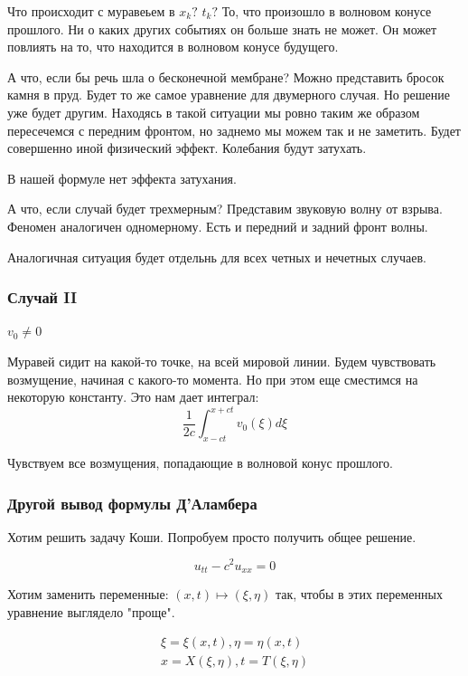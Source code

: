 \documentclass[12pt]{report}
\begin{document}
Что происходит с муравеьем в $x_k?$ $t_k?$ То, что произошло в волновом конусе прошлого. Ни о каких других событиях он больше знать не может. Он может повлиять на то, что находится в волновом конусе будущего. 

А что, если бы речь шла о бесконечной мембране? Можно представить бросок камня в пруд. Будет то же самое уравнение для двумерного случая. Но решение уже будет другим. Находясь в такой ситуации мы ровно таким же образом пересечемся с передним фронтом, но заднемо мы можем так и не заметить. Будет совершенно иной физический эффект. Колебания будут затухать. 

В нашей формуле нет эффекта затухания.

А что, если случай будет трехмерным? Представим звуковую волну от взрыва. Феномен аналогичен одномерному. Есть и передний и задний фронт волны. 

Аналогичная ситуация будет отдельнь для всех четных и нечетных случаев. 

\subsubsection{Случай II}
$v_0 \ne 0$

Муравей сидит на какой-то точке, на всей мировой линии. Будем чувствовать возмущение, начиная с какого-то момента. Но при этом еще сместимся на некоторую константу. Это нам дает интеграл: 
$$
    \frac{1}{2c} \int^{x + ct}_{x - ct}{v_0(\xi)d\xi}
$$

Чувствуем все возмущения, попадающие в волновой конус прошлого. 
    
\subsubsection{Другой вывод формулы Д'Аламбера}

Хотим решить задачу Коши. Попробуем просто получить общее решение. 

\begin{equation} \label{pro:DAeq}
    u_{tt} - c ^ 2 u_{xx} = 0
\end{equation}


Хотим заменить переменные: $(x, t) \mapsto (\xi, \eta)$ так, чтобы в этих переменных уравнение выглядело "проще". 

$$
    \begin{gathered}
        \xi = \xi(x, t), \eta = \eta(x, t)
        \\
        x = X(\xi, \eta), t = T(\xi, \eta)
    \end{gathered}
$$
\end{document}
